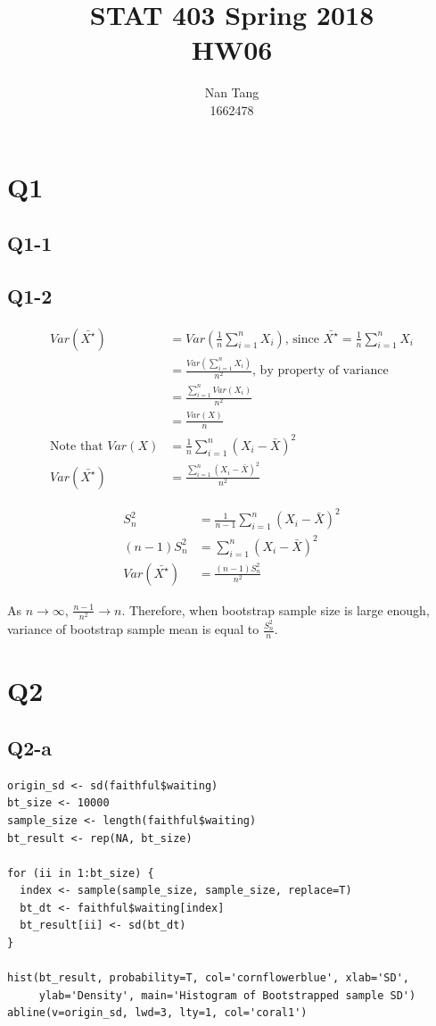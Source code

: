 \documentclass[12pt,letterpaper]{article}
\author{Nan Tang\\1662478}
\title{STAT 403 Spring 2018\\HW06}
\begin{document}
\maketitle

\section*{Q1}
\subsection*{Q1-1}

\subsection*{Q1-2}
\begin{align*}
Var(\bar{X^\star}) &= Var(\frac{1}{n} \sum_{i=1}^{n} X_i ) \text{, since } \bar{X^\star} = \frac{1}{n} \sum_{i=1}^{n} X_i \\
&= \frac{Var(\sum_{i=1}^{n} X_i)}{n^2} \text{, by property of variance} \\
&= \frac{\sum_{i=1}^{n} Var(X_i)}{n^2} \\
&= \frac{Var(X)}{n} \\
\text{Note that  } Var(X) &= \frac{1}{n} \sum_{i=1}^{n} (X_i - \bar{X})^2 \\
Var(\bar{X^\star}) &= \frac{\sum_{i=1}^{n}(X_i - \bar{X})^2}{n^2}
\end{align*}

\begin{align*}
S_n^2 &= \frac{1}{n-1} \sum_{i=1}^{n} (X_i - \bar{X})^2 \\
(n - 1) S_n^2 &= \sum_{i=1}^{n} (X_i - \bar{X})^2 \\
Var(\bar{X^\star}) &= \frac{(n-1) S_n^2}{n^2}
\end{align*}

\noindent As $n \rightarrow \infty$, $\frac{n - 1}{n^2} \rightarrow n$. Therefore, when bootstrap sample size is large enough, variance of bootstrap sample mean is equal to $\frac{S_n^2}{n}$.

\section*{Q2}
\subsection*{Q2-a}
\begin{verbatim}
origin_sd <- sd(faithful$waiting)
bt_size <- 10000
sample_size <- length(faithful$waiting)
bt_result <- rep(NA, bt_size)

for (ii in 1:bt_size) {
  index <- sample(sample_size, sample_size, replace=T)
  bt_dt <- faithful$waiting[index]
  bt_result[ii] <- sd(bt_dt)
}

hist(bt_result, probability=T, col='cornflowerblue', xlab='SD',
     ylab='Density', main='Histogram of Bootstrapped sample SD')
abline(v=origin_sd, lwd=3, lty=1, col='coral1')
\end{verbatim}
\end{document}
